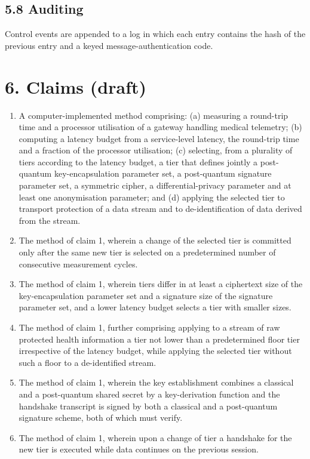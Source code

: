 \documentclass[11pt,a4paper]{article}
\begin{document}
\subsection*{5.8 Auditing}
Control events are appended to a log in which each entry contains the hash of the previous entry and a keyed message-authentication code.

\section*{6. Claims (draft)}
\begin{enumerate}[leftmargin=*,label=\textbf{\arabic*.}]
\item A computer-implemented method comprising: (a) measuring a round-trip time and a processor utilisation of a gateway handling medical telemetry; (b) computing a latency budget from a service-level latency, the round-trip time and a fraction of the processor utilisation; (c) selecting, from a plurality of tiers according to the latency budget, a tier that defines jointly a post-quantum key-encapsulation parameter set, a post-quantum signature parameter set, a symmetric cipher, a differential-privacy parameter and at least one anonymisation parameter; and (d) applying the selected tier to transport protection of a data stream and to de-identification of data derived from the stream.
\item The method of claim 1, wherein a change of the selected tier is committed only after the same new tier is selected on a predetermined number of consecutive measurement cycles.
\item The method of claim 1, wherein tiers differ in at least a ciphertext size of the key-encapsulation parameter set and a signature size of the signature parameter set, and a lower latency budget selects a tier with smaller sizes.
\item The method of claim 1, further comprising applying to a stream of raw protected health information a tier not lower than a predetermined floor tier irrespective of the latency budget, while applying the selected tier without such a floor to a de-identified stream.
\item The method of claim 1, wherein the key establishment combines a classical and a post-quantum shared secret by a key-derivation function and the handshake transcript is signed by both a classical and a post-quantum signature scheme, both of which must verify.
\item The method of claim 1, wherein upon a change of tier a handshake for the new tier is executed while data continues on the previous session.

\end{enumerate}
\end{document}
